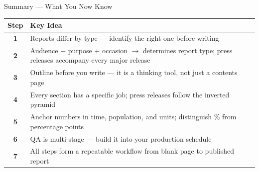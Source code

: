 \documentclass[xcolor={table,dvipsnames},aspectratio=169,11pt]{beamer}
\begin{document}
\begin{frame}{Summary --- What You Now Know}
    \scriptsize
    \begin{tabular}{cl}
    \toprule
    \rowcolor{nsoBlue}\color{white}\bfseries Step & \color{white}\bfseries Key Idea \\
    \midrule
    \textbf{1} & Reports differ by type --- identify the right one before writing \\
    \textbf{2} & Audience + purpose + occasion $\rightarrow$ determines report type; press releases accompany every major release \\
    \textbf{3} & Outline before you write --- it is a thinking tool, not just a contents page \\
    \textbf{4} & Every section has a specific job; press releases follow the inverted pyramid \\
    \textbf{5} & Anchor numbers in time, population, and units; distinguish \% from percentage points \\
    \textbf{6} & QA is multi-stage --- build it into your production schedule \\
    \textbf{7} & All steps form a repeatable workflow from blank page to published report \\
    \bottomrule
    \end{tabular}
\end{frame}
\end{document}
